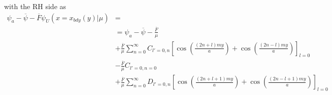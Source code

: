 \documentclass{article}
\begin{document}
with the RH side as
\begin{equation}
    \begin{split}
        \psi_a -\overline{\psi} -\overline{F}\psi_U(x=x_{bdy}(y)|\mu)&= \\
                                                                     &= \psi_a - \overline{\psi} - \frac{\overline{F}}{\mu} \\
                                                                     &+ \frac{\overline{F}}{\mu} \sum_{n=0}^{\infty} C_{l'=0,n} \left[\cos\left( \frac{(2n+l)my}{a} \right) + \cos\left( \frac{(2n-l)my}{a} \right) \right]_{l=0} \\
                                                                     &- \frac{\overline{F}}{\mu} C_{l'=0,n=0} \\
                                                                     &+ \frac{\overline{F}}{\mu} \sum_{n=0}^{\infty} D_{l'=0,n} \left[\cos\left( \frac{(2n+l+1)my}{a} \right) + \cos\left( \frac{(2n-l+1)my}{a} \right) \right]_{l=0}
    \end{split}
\end{equation} 
\end{document}
